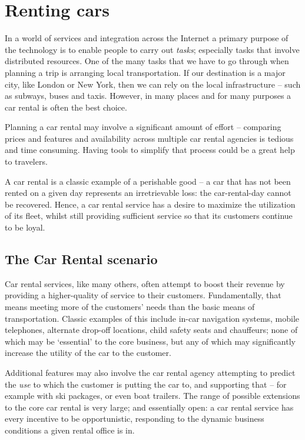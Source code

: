\chapter{Renting cars}
\label{rental}

In a world of services and integration across the Internet a primary purpose of the technology is to enable people to carry out \emph{tasks}; especially tasks that involve distributed resources. One of the many tasks that we have to go through when planning a trip is arranging local transportation. If our destination is a major city, like London or New York, then we can rely on the local infrastructure -- such as subways, buses and taxis. However, in many places and for many purposes a car rental is often the best choice.

Planning a car rental may involve a significant amount of effort -- comparing prices and features and availability across multiple car rental agencies is tedious and time consuming. Having tools to simplify that process could be a great help to travelers.

A car rental is a classic example of a perishable good --  a car that has not been rented on a given day represents an irretrievable loss: the car-rental-day cannot be recovered. Hence, a car rental service has a desire to maximize the utilization of its fleet, whilst still providing sufficient service so that its customers continue to be loyal.

\section{The Car Rental scenario}
\label{rental:scenario}

Car rental services, like many others, often attempt to boost their revenue by providing a higher-quality of service to their customers. Fundamentally, that means meeting more of the customers' needs than the basic means of transportation. Classic examples of this include in-car navigation systems, mobile telephones, alternate drop-off locations, child safety seats and chauffeurs; none of which may be `essential' to the core business, but any of which may significantly increase the utility of the car to the customer.

Additional features may also involve the car rental agency attempting to predict the \emph{use} to which the customer is putting the car to, and supporting that -- for example with ski packages, or even boat trailers. The range of possible extensions to the core car rental is very large; and essentially open: a car rental service has every incentive to be opportunistic, responding to the dynamic business conditions a given rental office is in. 

